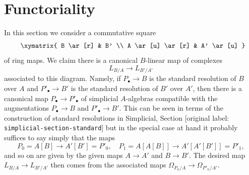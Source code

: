 \documentclass[10pt,a4paper]{article}
\theoremstyle{plain}
\theoremstyle{definition}
\theoremstyle{remark}
\numberwithin{equation}{subsection}
\begin{document}
\section{Functoriality}
\label{section-functoriality}

\noindent
In this section we consider a commutative square
\begin{equation}
\label{equation-commutative-square}
\vcenter{
\xymatrix{
B \ar[r] & B' \\
A \ar[u] \ar[r] & A' \ar[u]
}
}
\end{equation}
of ring maps. We claim there is a canonical $B$-linear map of complexes
$$
L_{B/A} \longrightarrow L_{B'/A'}
$$
associated to this diagram. Namely, if $P_\bullet \to B$ is the
standard resolution of $B$ over $A$ and $P'_\bullet \to B'$ is the
standard resolution of $B'$ over $A'$, then there is a canonical map
$P_\bullet \to P'_\bullet$
of simplicial $A$-algebras compatible with the augmentations
$P_\bullet \to B$ and $P'_\bullet \to B'$. This can be seen in terms
of the construction of standard resolutions in
Simplicial, Section \textnormal{[original label: \nolinkurl{simplicial-section-standard}]}
but in the special case at hand it probably suffices to say simply
that the maps
$$
P_0 = A[B] \longrightarrow A'[B'] = P'_0,\quad
P_1 = A[A[B]] \longrightarrow A'[A'[B']] = P'_1,
$$
and so on are given by the given maps $A \to A'$ and $B \to B'$.
The desired map $L_{B/A} \to L_{B'/A'}$ then comes from the associated
maps $\Omega_{P_n/A} \to \Omega_{P'_n/A'}$.
\end{document}
